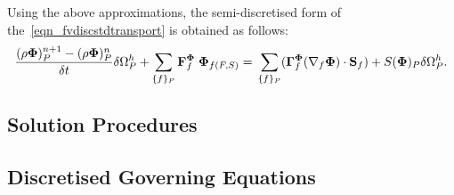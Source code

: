 Using the above approximations, the semi-discretised form of the~\ref{eqn_fvdiscstdtransport} is obtained as follows:
\begin{equation}\label{eqn_semidiscrete}
    \frac{(\mathbf{\rho\Phi})_{P}^{n+1} - (\mathbf{\rho\Phi})_{P}^{n}}{\delta t} \delta\Omega^{h}_{P} + \sum_{\{f\}_{P}} \mathbf{F}^{\mathbf{\Phi}}_{f} \;\mathbf{\Phi}_{f(F,S)} =\\
    \sum_{\{f\}_{P}} (\mathbf{\Gamma}^{\mathbf{\Phi}}_{f} (\nabla_{f}\mathbf{\Phi}) \cdot \mathbf{S}_{f}) + S(\mathbf{\Phi})_{P}\delta\Omega^{h}_{P}.
\end{equation}
\subsection{Solution Procedures}
\subsection{Discretised Governing Equations}







